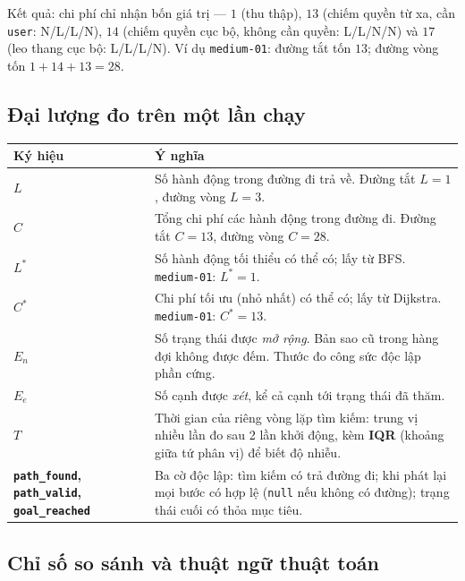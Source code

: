 \documentclass[11pt,a4paper]{article}
\newcommand{\Cs}{C^{*}}
\newcommand{\Ls}{L^{*}}
\newcommand{\En}{E_{n}}
\begin{document}
Kết quả: chi phí chỉ nhận bốn giá trị --- $1$ (thu thập), $13$ (chiếm quyền từ xa, cần \texttt{user}: N/L/L/N), $14$ (chiếm quyền cục bộ, không cần quyền: L/L/N/N) và $17$ (leo thang cục bộ: L/L/L/N). Ví dụ \texttt{medium-01}: đường tắt tốn $13$; đường vòng tốn $1+14+13=28$.

\subsection{Đại lượng đo trên một lần chạy}

\begin{longtable}{@{}Y{2.6cm}Y{13.2cm}@{}}
\toprule
Ký hiệu & Ý nghĩa \\
\midrule
\endhead
\textbf{$L$} & Số hành động trong đường đi trả về. Đường tắt $L=1$, đường vòng $L=3$. \\
\textbf{$C$} & Tổng chi phí các hành động trong đường đi. Đường tắt $C=13$, đường vòng $C=28$. \\
\textbf{$\Ls$} & Số hành động tối thiểu có thể có; lấy từ BFS. \texttt{medium-01}: $\Ls=1$. \\
\textbf{$\Cs$} & Chi phí tối ưu (nhỏ nhất) có thể có; lấy từ Dijkstra. \texttt{medium-01}: $\Cs=13$. \\
\textbf{$\En$} & Số trạng thái được \emph{mở rộng}. Bản sao cũ trong hàng đợi không được đếm. Thước đo công sức độc lập phần cứng. \\
\textbf{$E_e$} & Số cạnh được \emph{xét}, kể cả cạnh tới trạng thái đã thăm. \\
\textbf{$T$} & Thời gian của riêng vòng lặp tìm kiếm: trung vị nhiều lần đo sau 2 lần khởi động, kèm \textbf{IQR} (khoảng giữa tứ phân vị) để biết độ nhiễu. \\
\textbf{\texttt{path\_found}, \texttt{path\_valid}, \texttt{goal\_reached}} & Ba cờ độc lập: tìm kiếm có trả đường đi; khi phát lại mọi bước có hợp lệ (\texttt{null} nếu không có đường); trạng thái cuối có thỏa mục tiêu. \\
\bottomrule
\end{longtable}

\subsection{Chỉ số so sánh và thuật ngữ thuật toán}
\end{document}
